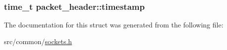 \subsubsection[{\texorpdfstring{timestamp}{timestamp}}]{\setlength{\rightskip}{0pt plus 5cm}time\+\_\+t packet\+\_\+header\+::timestamp}\hypertarget{structpacket__header_a4d204de563e35da6b3984aa98c74d67b}{}\label{structpacket__header_a4d204de563e35da6b3984aa98c74d67b}


The documentation for this struct was generated from the following file\+:\begin{DoxyCompactItemize}
\item 
src/common/\hyperlink{sockets_8h}{sockets.\+h}\end{DoxyCompactItemize}
